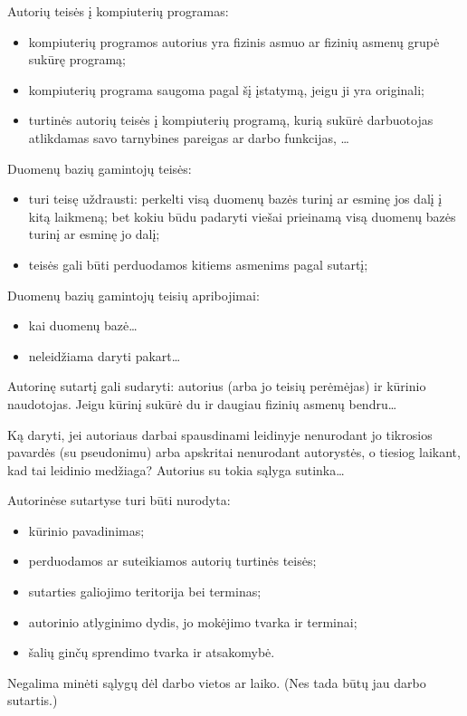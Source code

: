 Autorių teisės į kompiuterių programas:
\begin{itemize}
  \item kompiuterių programos autorius yra fizinis asmuo ar fizinių
    asmenų grupė sukūrę programą;
  \item kompiuterių programa saugoma pagal šį įstatymą, jeigu ji yra
    originali;
  \item turtinės autorių teisės į kompiuterių programą, kurią sukūrė
    darbuotojas atlikdamas savo tarnybines pareigas ar darbo funkcijas,
    …
\end{itemize}

Duomenų bazių gamintojų teisės:
\begin{itemize}
  \item turi teisę uždrausti: perkelti visą duomenų bazės turinį ar esminę
    jos dalį į kitą laikmeną; bet kokiu būdu padaryti viešai
    prieinamą visą duomenų bazės turinį ar esminę jo dalį;
  \item teisės gali būti perduodamos kitiems asmenims pagal sutartį;
\end{itemize}

Duomenų bazių gamintojų teisių apribojimai:
\begin{itemize}
  \item kai duomenų bazė…
  \item neleidžiama daryti pakart…
\end{itemize}

Autorinę sutartį gali sudaryti: autorius (arba jo teisių perėmėjas) ir
kūrinio naudotojas. Jeigu kūrinį sukūrė du ir daugiau fizinių
asmenų bendru…

Ką daryti, jei autoriaus darbai spausdinami leidinyje nenurodant jo tikrosios pavardės (su pseudonimu) arba apskritai nenurodant autorystės, o tiesiog laikant, kad tai leidinio medžiaga? Autorius su tokia sąlyga sutinka…

Autorinėse sutartyse turi būti nurodyta:
\begin{itemize}
  \item kūrinio pavadinimas;
  \item perduodamos ar suteikiamos autorių turtinės teisės;
  \item sutarties galiojimo teritorija bei terminas;
  \item autorinio atlyginimo dydis, jo mokėjimo tvarka ir terminai;
  \item šalių ginčų sprendimo tvarka ir atsakomybė.
\end{itemize}
Negalima minėti sąlygų dėl darbo vietos ar laiko. (Nes tada būtų jau
darbo sutartis.)

